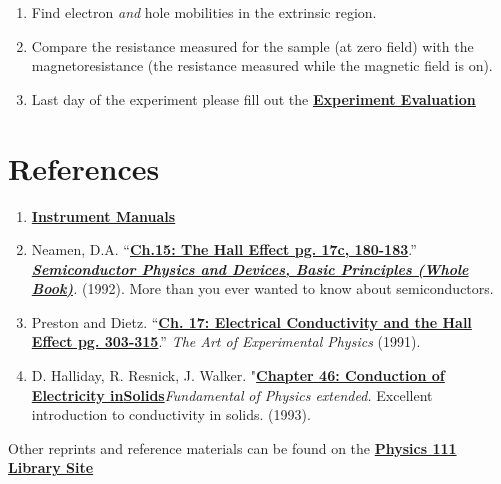 \documentclass{../lab}
\begin{document}
\begin{enumerate}
    \item Find electron \emph{and} hole mobilities in the extrinsic region.

    \item Compare the resistance measured for the sample (at zero field) with the magnetoresistance (the resistance measured while the magnetic field is on).

    \item Last day of the experiment please fill out the \href{\ExperimentEvaluation}{\textbf{Experiment Evaluation}}

\end{enumerate}

\section{References}
\label{sec:References}

\begin{enumerate}
    \item \href{http://dev-physicsadv.pantheon.berkeley.edu/node/106}{\textbf{Instrument Manuals}}

    \item Neamen, D.A. ``\href{http://physics111.lib.berkeley.edu/Physics111/Reprints/SHE/09-Semiconductors.pdf}{\textbf{Ch.15: The Hall Effect pg. 17c, 180-183}}.'' \emph{\href{http://www.scribd.com/full/15347863?access\_key=key-6nqzpsm5tluzzcfl6x3}{\textbf{Semiconductor Physics and Devices, Basic Principles (Whole Book)}}.} (1992). More than you ever wanted to know about semiconductors.

    \item Preston and Dietz. ``\href{http://physics111.lib.berkeley.edu/Physics111/Reprints/SHE/07-Electrical\_Conductivity.pdf}{\textbf{Ch. 17: Electrical Conductivity and the Hall Effect pg. 303-315}}.'' \emph{The Art of Experimental Physics} (1991).

    \item D. Halliday, R. Resnick, J. Walker. "\href{http://physics111.lib.berkeley.edu/Physics111/Reprints/SHE/Halliday\_Resnick/Ch.\%2046\%20Conduction\%20of\%20electricity\%20in\%20solids.pdf}{\textbf{Chapter 46: Conduction of Electricity in}}\href{http://physics111.lib.berkeley.edu/Physics111/Reprints/SHE/Halliday\_Resnick/Ch.\%2046\%20Conduction\%20of\%20electricity\%20in\%20solids.pdf}{\textbf{Solids}}\emph{Fundamental}\emph{ of Physics extended.} Excellent introduction to conductivity in solids. (1993).

\end{enumerate}

\noindent Other reprints and reference materials can be found on the \href{http://physics111.lib.berkeley.edu/Physics111/Reprints/SHE/SHE\_index.html}{\textbf{Physics 111 Library Site}}
\end{document}
